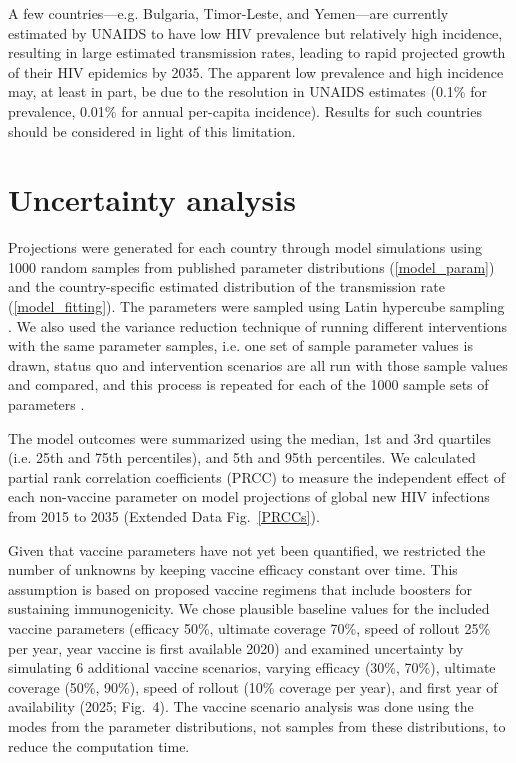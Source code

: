 \documentclass{article}
\begin{document}
A few countries—e.g. Bulgaria, Timor-Leste, and Yemen—are currently
estimated by UNAIDS to have low HIV prevalence but relatively high
incidence, resulting in large estimated transmission rates, leading to
rapid projected growth of their HIV epidemics by 2035. The apparent
low prevalence and high incidence may, at least in part, be due to the
resolution in UNAIDS estimates (0.1\% for prevalence, 0.01\% for
annual per-capita incidence).  Results for such countries should be
considered in light of this limitation.


\section{Uncertainty analysis}
\label{uncertainty}

Projections were generated for each country through model simulations
using 1000 random samples from published parameter distributions
(\autoref{model_param}) and the country-specific estimated
distribution of the transmission rate (\autoref{model_fitting}). The
parameters were sampled using Latin hypercube sampling
\autocite{blower1994}.  We also used the variance reduction technique of
running different interventions with the same parameter samples, i.e.
one set of sample parameter values is drawn, status quo and
intervention scenarios are all run with those sample values and
compared, and this process is repeated for each of the 1000 sample
sets of parameters \autocite{shechter2006}.

The model outcomes were summarized using the median, 1st and 3rd
quartiles (i.e. 25th and 75th percentiles), and 5th and 95th
percentiles.  We calculated partial rank correlation coefficients
(PRCC) \autocite{blower1994} to measure the independent effect of each
non-vaccine parameter on model projections of global new HIV
infections from 2015 to 2035 (Extended Data Fig.~\ref*{PRCCs}).

Given that vaccine parameters have not yet been quantified, we
restricted the number of unknowns by keeping vaccine efficacy constant
over time.  This assumption is based on proposed vaccine regimens that
include boosters for sustaining immunogenicity.  We chose plausible
baseline values for the included vaccine parameters (efficacy 50\%,
ultimate coverage 70\%, speed of rollout 25\% per year, year vaccine
is first available 2020) and examined uncertainty by simulating 6
additional vaccine scenarios, varying efficacy (30\%, 70\%), ultimate
coverage (50\%, 90\%), speed of rollout (10\% coverage per year), and
first year of availability (2025; Fig.~4). The vaccine scenario
analysis was done using the modes from the parameter distributions,
not samples from these distributions, to reduce the computation time.
\end{document}

